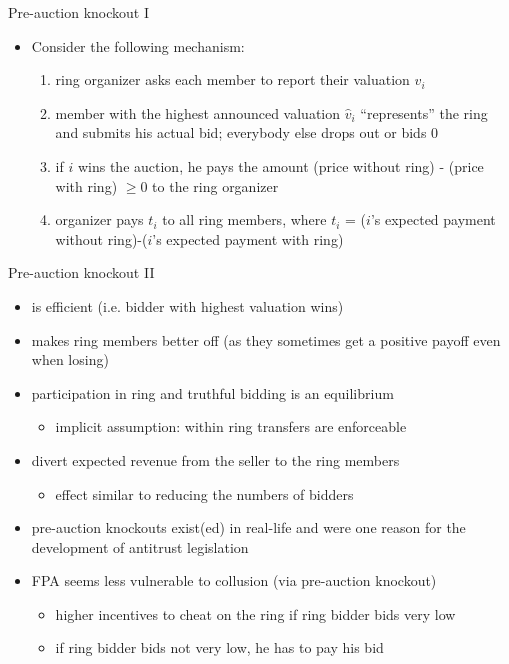\documentclass[bigger]{beamer}
\begin{document}
\begin{frame}[label={sec:org9aacaf4}]{Pre-auction knockout I}
\begin{itemize}
\item Consider the following mechanism:
\begin{enumerate}
\item ring organizer asks each member to report their valuation \(v_i\)
\item member with the highest announced valuation \(\hat v_i\) “represents” the ring and submits his actual bid; everybody else drops out or bids 0
\item if \(i\) wins the auction, he pays the amount\linebreak
(price without ring) - (price with ring) \(\geq 0\) \linebreak
to the ring organizer
\item organizer pays \(t_i\) to all ring members, where\linebreak
\(t_i\) = (\(i\)'s expected payment without ring)-(\(i\)'s expected payment with ring)
\end{enumerate}
\end{itemize}
\end{frame}

\begin{frame}[label={sec:orgf04fb56}]{Pre-auction knockout II}
\begin{itemize}
\item is efficient (i.e. bidder with highest valuation wins)
\item makes ring members better off (as they sometimes get a positive payoff even when losing)
\item participation in ring and truthful bidding is an equilibrium
\begin{itemize}
\item implicit assumption: within ring transfers are enforceable
\end{itemize}
\item divert expected revenue from the seller to the ring members
\begin{itemize}
\item effect similar to reducing the numbers of bidders
\pause
\end{itemize}
\item pre-auction knockouts exist(ed) in real-life and were one reason for the development of antitrust legislation
\item FPA seems less vulnerable to collusion (via pre-auction knockout)
\begin{itemize}
\item higher incentives to cheat on the ring if ring bidder bids very low
\item if ring bidder bids not very low, he has to pay his bid
\end{itemize}
\end{itemize}
\end{frame}
\end{document}
